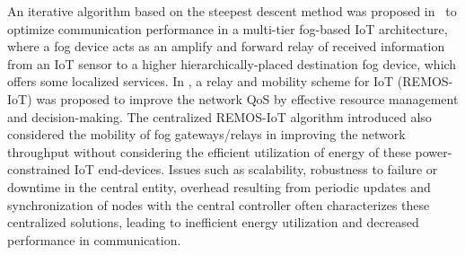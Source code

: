 \documentclass[journal]{IEEEtran}
\begin{document}
An iterative algorithm based on the steepest descent method was proposed in~\cite{OmoniwaRelay2018} to optimize communication performance in a multi-tier fog-based IoT architecture, where a fog device acts as an amplify and forward relay of received information from an IoT sensor to a higher hierarchically-placed destination fog device, which offers some localized services. In \cite{Simiscuka2018}, a relay and mobility scheme for IoT (REMOS-IoT) was proposed to improve the network QoS by effective resource management and decision-making. The centralized REMOS-IoT algorithm introduced also considered the mobility of fog gateways/relays in improving the network throughput without considering the efficient utilization of energy of these power-constrained IoT end-devices. Issues such as scalability, robustness to failure or downtime in the central entity, overhead resulting from periodic updates and synchronization of nodes with the central controller often characterizes these centralized solutions, leading to inefficient energy utilization and decreased performance in communication.

%
\end{document}
